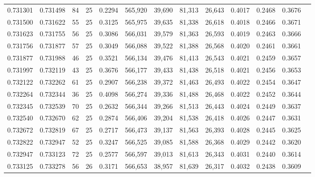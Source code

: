 \begin{tabular}{rrrrrrrrrrrrr}
0.731301 & 0.731498 &    84 &  25 &                                     0.2294 & 565,920 &  39,690 &  81,313 &  26,643 & 0.4017 & 0.2468 & 0.3676 \\
0.731500 & 0.731622 &    55 &  25 &                                     0.3125 & 565,975 &  39,635 &  81,338 &  26,618 & 0.4018 & 0.2466 & 0.3671 \\
0.731623 & 0.731755 &    56 &  25 &                                     0.3086 & 566,031 &  39,579 &  81,363 &  26,593 & 0.4019 & 0.2463 & 0.3666 \\
0.731756 & 0.731877 &    57 &  25 &                                     0.3049 & 566,088 &  39,522 &  81,388 &  26,568 & 0.4020 & 0.2461 & 0.3661 \\
0.731877 & 0.731988 &    46 &  25 &                                     0.3521 & 566,134 &  39,476 &  81,413 &  26,543 & 0.4021 & 0.2459 & 0.3657 \\
0.731997 & 0.732119 &    43 &  25 &                                     0.3676 & 566,177 &  39,433 &  81,438 &  26,518 & 0.4021 & 0.2456 & 0.3653 \\
0.732122 & 0.732262 &    61 &  25 &                                     0.2907 & 566,238 &  39,372 &  81,463 &  26,493 & 0.4022 & 0.2454 & 0.3647 \\
0.732264 & 0.732344 &    36 &  25 &                                     0.4098 & 566,274 &  39,336 &  81,488 &  26,468 & 0.4022 & 0.2452 & 0.3644 \\
0.732345 & 0.732539 &    70 &  25 &                                     0.2632 & 566,344 &  39,266 &  81,513 &  26,443 & 0.4024 & 0.2449 & 0.3637 \\
0.732540 & 0.732670 &    62 &  25 &                                     0.2874 & 566,406 &  39,204 &  81,538 &  26,418 & 0.4026 & 0.2447 & 0.3631 \\
0.732672 & 0.732819 &    67 &  25 &                                     0.2717 & 566,473 &  39,137 &  81,563 &  26,393 & 0.4028 & 0.2445 & 0.3625 \\
0.732822 & 0.732947 &    52 &  25 &                                     0.3247 & 566,525 &  39,085 &  81,588 &  26,368 & 0.4029 & 0.2442 & 0.3620 \\
0.732947 & 0.733123 &    72 &  25 &                                     0.2577 & 566,597 &  39,013 &  81,613 &  26,343 & 0.4031 & 0.2440 & 0.3614 \\
0.733125 & 0.733278 &    56 &  26 &                                     0.3171 & 566,653 &  38,957 &  81,639 &  26,317 & 0.4032 & 0.2438 & 0.3609 \\

\end{tabular}

